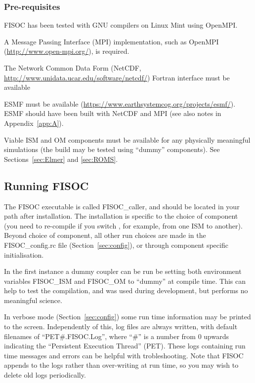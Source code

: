 \documentclass[12pt]{article}
\begin{document}
\subsubsection{Pre-requisites}
\label{sec:PreReq}

FISOC has been tested with GNU compilers on Linux Mint using OpenMPI. 

A Message Passing Interface (MPI) implementation, such as 
OpenMPI (\url{http://www.open-mpi.org/}), is required. 

The Network Common Data Form (NetCDF,  
\url{http://www.unidata.ucar.edu/software/netcdf/}) 
Fortran interface must be available 

ESMF must be available (\url{https://www.earthsystemcog.org/projects/esmf/}).  
ESMF should have been built with NetCDF and MPI 
(see also notes in Appendix~\ref{app:A}).


Viable ISM and OM components must be available for any physically meaningful simulations
(the build may be tested using ``dummy'' components).  
See Sections~\ref{sec:Elmer} and \ref{sec:ROMS}.


\subsection{Running FISOC}

The FISOC executable is called FISOC\_caller, and should be located in your path after installation. 
The installation is specific to the choice of component (you need to re-compile if you switch , for 
example, from one ISM to another).  
Beyond choice of component, all other run choices are made in the FISOC\_config.rc file
(Section~\ref{sec:config}), 
or through component specific initialisation.

In the first instance a dummy coupler can be run be setting both environment variables FISOC\_ISM and 
FISOC\_OM to ``dummy'' at compile time.  This can help to test the compilation, and was used during development, 
but performs no meaningful science.  

In verbose mode (Section~\ref{sec:config}) some run time information may be printed to the screen.  
Independently of this, log files are always written, 
with default filenames of ``PET\#.FISOC.Log'', where ``\#'' is a number from 0 upwards indicating the 
``Persistent Execution Thread'' (PET). 
These logs containing run time messages and errors can be helpful with trobleshooting.
Note that FISOC appends to the logs rather than over-writing at run time, so you may wish to delete old logs 
periodically. 
\end{document}
